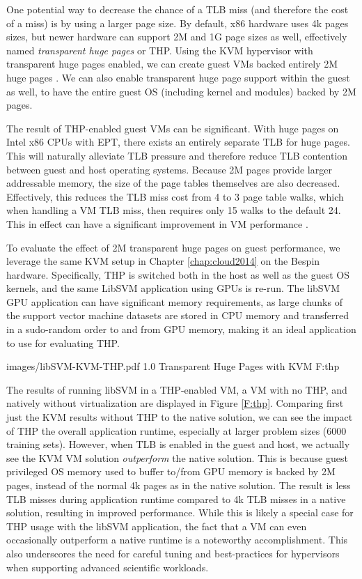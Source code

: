 One potential way to decrease the chance of a TLB miss (and therefore the cost of a miss) is by using a larger page size. By default, x86 hardware uses 4k pages sizes, but newer hardware can support 2M and 1G page sizes as well, effectively named \emph{transparent huge pages} or THP.  Using the KVM hypervisor with transparent huge pages enabled, we can create guest VMs backed entirely 2M huge pages \cite{Arcangeli:2010}. We can also enable transparent huge page support within the guest as well, to have the entire guest OS (including kernel and modules) backed by 2M pages. 

The result of THP-enabled guest VMs can be significant. With huge pages on Intel x86 CPUs with EPT, there exists an entirely separate TLB for huge pages. This will naturally alleviate TLB pressure and therefore reduce TLB contention between guest and host operating systems. Because 2M pages provide larger addressable memory, the size of the page tables themselves are also decreased.  Effectively, this reduces the TLB miss cost from 4 to 3 page table walks, which when handling a VM TLB miss, then requires only 15 walks to the default 24. This in effect can have a significant improvement in VM performance \cite{Arcangeli:2010}.

To evaluate the effect of 2M transparent huge pages on guest performance, we leverage the same KVM setup in Chapter \ref{chap:cloud2014} on the Bespin hardware. Specifically, THP is switched both in the host as well as the guest OS kernels, and the same LibSVM application using GPUs is re-run. The libSVM GPU application can have significant memory requirements, as large chunks of the support vector machine datasets are stored in CPU memory and transferred in a sudo-random order to and from GPU memory, making it an ideal application to use for evaluating THP.



  {images/libSVM-KVM-THP.pdf}
  {1.0}
  {Transparent Huge Pages with KVM}
  {F:thp}


The results of running libSVM in a THP-enabled VM, a VM with no THP, and natively without virtualization are displayed in Figure \ref{F:thp}.  Comparing first just the KVM results without THP to the native solution, we can see the impact of THP the overall application runtime, especially at larger problem sizes (6000 training sets). However, when TLB is enabled in the guest and host, we actually see the KVM VM solution \emph{outperform} the native solution. This is because guest privileged OS memory used to buffer to/from GPU memory is backed by 2M pages, instead of the normal 4k pages as in the native solution. The result is less TLB misses during application runtime compared to 4k TLB misses in a native solution, resulting in improved performance.  While this is likely a special case for THP usage with the libSVM application, the fact that a VM can even occasionally outperform a native runtime is a noteworthy accomplishment. This also underscores the need for careful tuning and best-practices for hypervisors when supporting advanced scientific workloads. 

